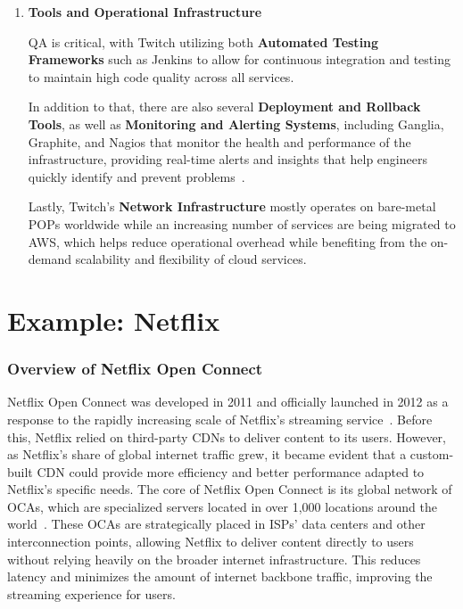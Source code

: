 \begin{enumerate}
    \item \textbf{Tools and Operational Infrastructure}

    \ac{QA} is critical, with Twitch utilizing both \textbf{Automated Testing Frameworks} such as Jenkins to allow for continuous integration and testing to maintain high code quality across all services.

    In addition to that, there are also several \textbf{Deployment and Rollback Tools}, as well as \textbf{Monitoring and Alerting Systems}, including Ganglia, Graphite, and Nagios that monitor the health and performance of the infrastructure, providing real-time alerts and insights that help engineers quickly identify and prevent problems~\parencite{twitch_engineering}.

    Lastly, Twitch’s \textbf{Network Infrastructure} mostly operates on bare-metal \ac{POPs} worldwide while an increasing number of services are being migrated to \ac{AWS}, which helps reduce operational overhead while benefiting from the on-demand scalability and flexibility of cloud services.

\end{enumerate}

\section{Example: Netflix}


\subsubsection{Overview of Netflix Open Connect}

Netflix Open Connect was developed in 2011 and officially launched in 2012 as a response to the rapidly increasing scale of Netflix's streaming service~\parencite{netflix_functionality}. Before this, Netflix relied on third-party \ac{CDN}s to deliver content to its users. However, as Netflix's share of global internet traffic grew, it became evident that a custom-built \ac{CDN} could provide more efficiency and better performance adapted to Netflix's specific needs.
The core of Netflix Open Connect is its global network of \ac{OCAs}, which are specialized servers located in over 1,000 locations around the world~\parencite{netflix_open_connect}. These \ac{OCAs} are strategically placed in \ac{ISPs}' data centers and other interconnection points, allowing Netflix to deliver content directly to users without relying heavily on the broader internet infrastructure. This reduces latency and minimizes the amount of internet backbone traffic, improving the streaming experience for users.

